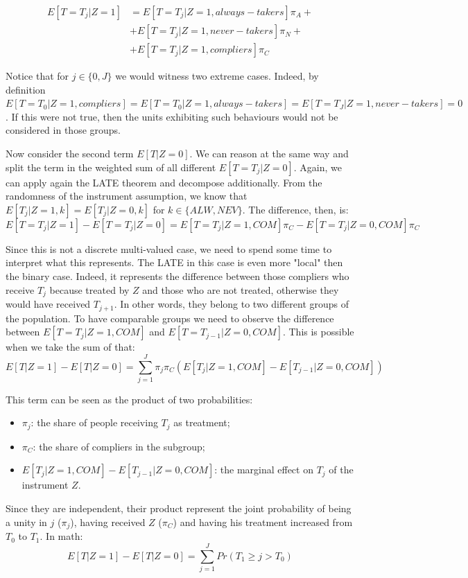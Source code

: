 \documentclass[a4paper,12pt,oneside,English]{article}
\begin{document}
\[
\begin{split}
E[T=T_j|Z=1]&=E[T=T_j|Z=1, always-takers]\pi_A+\\&+E[T=T_j|Z=1, never-takers]\pi_N+\\&+E[T=T_j|Z=1, compliers]\pi_C
\end{split}
\]

Notice that for $j\in\{0,J\}$ we would witness two extreme cases. Indeed, by definition $E[T=T_0|Z=1, compliers]=E[T=T_0|Z=1, always-takers]=E[T=T_J|Z=1, never-takers]=0$. If this were not true, then the units exhibiting such behaviours would not be considered in those groups.

Now consider the second term $E[T|Z=0]$. We can reason at the same way and split the term in the weighted sum of all different $E[T=T_j|Z=0]$. Again, we can apply again the LATE theorem and decompose additionally. From the randomness of the instrument assumption, we know that $E[T_j|Z=1, k]=E[T_j|Z=0, k]$ for $k\in\{ALW,NEV\}$. The difference, then, is:
\[
E[T=T_j|Z=1]-E[T=T_j|Z=0]=E[T=T_j|Z=1, COM]\pi_C-E[T=T_j|Z=0, COM]\pi_C
\]

Since this is not a discrete multi-valued case, we need to spend some time to interpret what this represents. The LATE in this case is even more "local" then the binary case. Indeed, it represents the difference between those compliers who receive $T_j$ because treated by $Z$ and those who are not treated, otherwise they would have received $T_{j+1}$. In other words, they belong to two different groups of the population. To have comparable groups we need to observe the difference between $E[T=T_j|Z=1, COM]$ and $E[T=T_{j-1}|Z=0, COM]$. This is possible when we take the sum of that:
\[
E[T|Z=1]-E[T|Z=0]=\sum_{j=1}^J \pi_j \pi_C(E[T_j|Z=1, COM]-E[T_{j-1}|Z=0, COM])
\]

This term can be seen as the product of two probabilities:
\begin{itemize}
    \item $\pi_j$: the share of people receiving $T_j$ as treatment;
    \item $\pi_C$: the share of compliers in the subgroup;
    \item $E[T_j|Z=1, COM]-E[T_{j-1}|Z=0, COM]$: the marginal effect on $T_j$ of the instrument $Z$.
\end{itemize}

Since they are independent, their product represent the joint probability of being a unity in $j$ ($\pi_j$), having received $Z$ ($\pi_C$) and having his treatment increased from $T_0$ to $T_1$. In math:
\begin{equation}
E[T|Z=1]-E[T|Z=0]=\sum_{j=1}^J Pr(T_1\geq j>T_0) 
\label{eq2}    
\end{equation}
\end{document}

